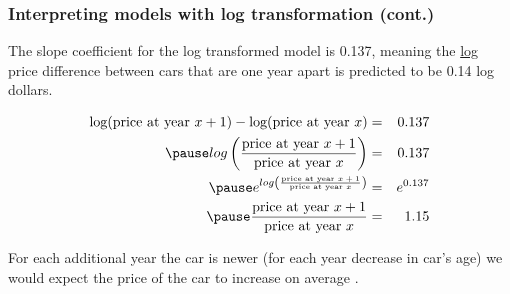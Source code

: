 \documentclass[11pt,containsverbatim,handout,xcolor=xelatex,dvipsnames,table]{beamer}
\begin{document}
\begin{frame}
\frametitle{Interpreting models with log transformation (cont.)}

The slope coefficient for the log transformed model is 0.137, meaning the \underline{log} price difference between cars that are one year apart is predicted to be 0.14 log dollars.

\begin{eqnarray*}
\text{log(price at year $x + 1$)} - \text{log(price at year $x$)} &=& 0.137 \\
\pause
log \pr{ \frac{\text{price at year $x + 1$}}{\text{price at year $x$}} } &=& 0.137 \\
\pause
e^{log \pr{ \frac{\text{price at year $x + 1$}}{\text{price at year $x$}} }} &=& e^{0.137} \\
\pause
\frac{\text{price at year $x + 1$}}{\text{price at year $x$}} &=& 1.15
\end{eqnarray*}

\pause

For each additional year the car is newer (for each year decrease in car's age) we would expect the price of the car to increase on average .

\end{frame}

\end{document}
